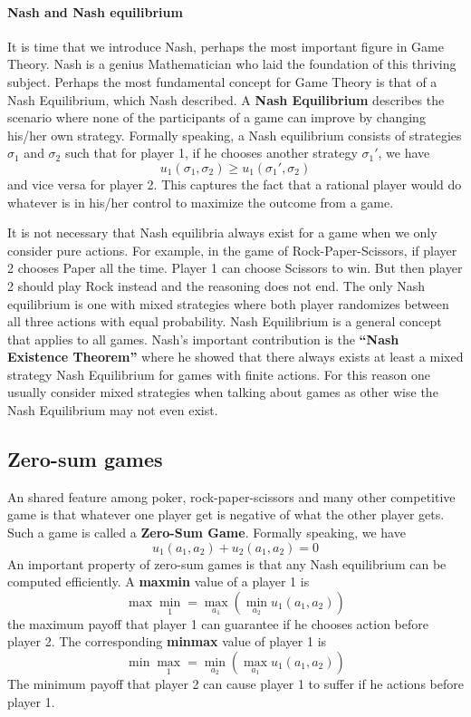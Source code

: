 \documentclass[10pt,a4paper]{article}
\begin{document}
\paragraph{Nash and Nash equilibrium}
It is time that we introduce Nash, perhaps the most important figure in Game Theory. Nash is a genius Mathematician who laid the foundation of this thriving subject. Perhaps the most fundamental concept for Game Theory is that of a Nash Equilibrium, which Nash described. A \textbf{Nash Equilibrium} describes the scenario where none of the participants of a game can improve by changing his/her own strategy. Formally speaking, a Nash equilibrium consists of strategies $\sigma_1$ and $\sigma_2$ such that for player 1, if he chooses another strategy $\sigma_1'$, we have
$$
u_1(\sigma_1, \sigma_2) \geq u_1(\sigma_1', \sigma_2)
$$
and vice versa for player 2. This captures the fact that a rational player would do whatever is in his/her control to maximize the outcome from a game. 

It is not necessary that Nash equilibria always exist for a game when we only consider pure actions. For example, in the game of Rock-Paper-Scissors, if player 2 chooses Paper all the time. Player 1 can choose Scissors to win. But then player 2 should play Rock instead and the reasoning does not end. The only Nash equilibrium is one with mixed strategies where both player randomizes between all three actions with equal probability. Nash Equilibrium is a general concept that applies to all games. Nash's important contribution is the \textbf{``Nash Existence Theorem''} where he showed that there always exists at least a mixed strategy Nash Equilibrium for games with finite actions. For this reason one usually consider mixed strategies when talking about games as other wise the Nash Equilibrium may not even exist.

\subsection{Zero-sum games}
An shared feature among poker, rock-paper-scissors and many other competitive game is that whatever one player get is negative of what the other player gets. Such a game is called a \textbf{Zero-Sum Game}. Formally speaking, we have 
$$
u_1(a_1, a_2) + u_2(a_1, a_2) = 0
$$
An important property of zero-sum games is that any Nash equilibrium can be computed efficiently. A \textbf{maxmin} value of a player 1 is 
$$
\max\min_1 = \max_{a_1}(\min_{a_{2}} u_1(a_1, a_{2}))
$$
the maximum payoff that player 1 can guarantee if he chooses action before player 2. The corresponding \textbf{minmax} value of player 1 is
$$
\min\max_1 = \min_{a_2}(\max_{a_{1}} u_1(a_1, a_{2}))
$$
The minimum payoff that player 2 can cause player 1 to suffer if he actions before player 1. 
\end{document}
